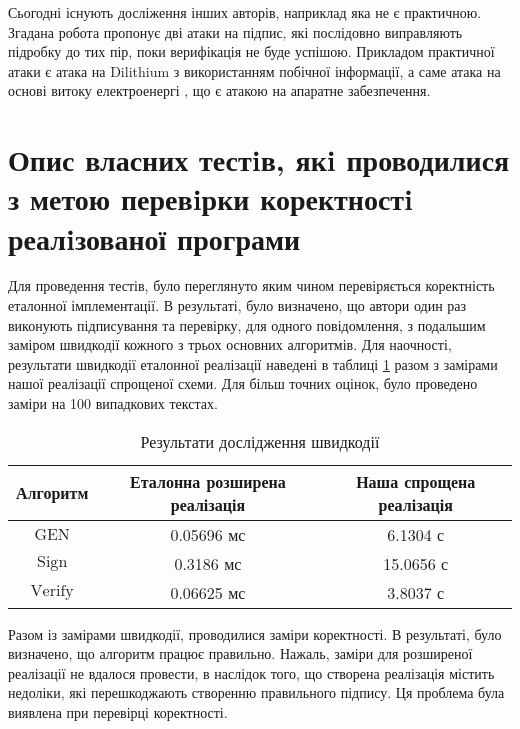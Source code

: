 \documentclass[12pt]{HomusWorkus}
\begin{document}
Сьогодні існують досліження інших авторів, наприклад \cite{Krahmer24} яка не є практичною. Згадана робота пропонує дві атаки на підпис, які послідовно виправляють підробку до тих пір, поки верифікація не буде успішою. Прикладом практичної атаки є атака на Dilithium з використанням побічної інформації, а саме атака на основі витоку електроенергі \cite{Wang2023}, що є атакою на апаратне забезпечення.




\section{Опис власних тестiв, якi проводилися з метою перевiрки коректностi реалiзованої програми}

Для проведення тестів, було переглянуто яким чином перевіряється коректність еталонної імплементації. В результаті, було визначено, що автори один раз виконують підписування та перевірку, для одного повідомлення, з подальшим заміром швидкодії кожного з трьох основних алгоритмів.
Для наочності, результати швидкодії еталонної реалізації наведені в таблиці \ref{tab:speeeeed} разом з замірами нашої реалізації спрощеної схеми. Для більш точних оцінок, було проведено заміри на 100 випадкових текстах. 

\begin{table}[ht]
    \centering
    \begin{tabular}{|c|c|c|}
        \hline
        Алгоритм & Еталонна розширена реалізація & Наша спрощена реалізація \\\hline
        $\mathrm{GEN}$ & 0.05696 мс & 6.1304 с \\\hline
        $\mathrm{Sign}$ & 0.3186 мс & 15.0656 с \\\hline
        $\mathrm{Verify}$ & 0.06625 мс & 3.8037 с \\\hline
        \hline
    \end{tabular}
    \caption{Результати дослідження швидкодії}
    \label{tab:speeeeed}
\end{table}

Разом із замірами швидкодії, проводилися заміри коректності. В результаті, було визначено, що алгоритм працює правильно.
Нажаль, заміри для розширеної реалізації не вдалося провести, в наслідок того, що створена реалізація містить недоліки, які перешкоджають створенню правильного підпису. Ця проблема була виявлена при перевірці коректності.
\end{document}
